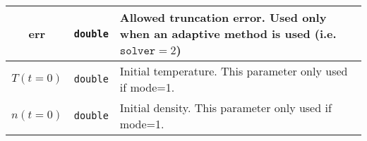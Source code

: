 \documentclass[preprint,10pt]{aastex}
\begin{document}
\begin{appendix}
\begin{table}[]
\begin{center}
\begin{tabular}{c  c || p{10cm}}
	err & \texttt{double} & Allowed truncation error. Used only when an adaptive method is used (i.e. $\texttt{solver}=2$) \\ \hline
	$T(t=0)$ & \texttt{double} & Initial temperature. This parameter only used if mode=1. \\ \hline
	$n(t=0)$ & \texttt{double} & Initial density. This parameter only used if mode=1. \\
	\hline
	\end{tabular}
\end{center}
\end{table}
\end{appendix}
%


%
\end{document}
